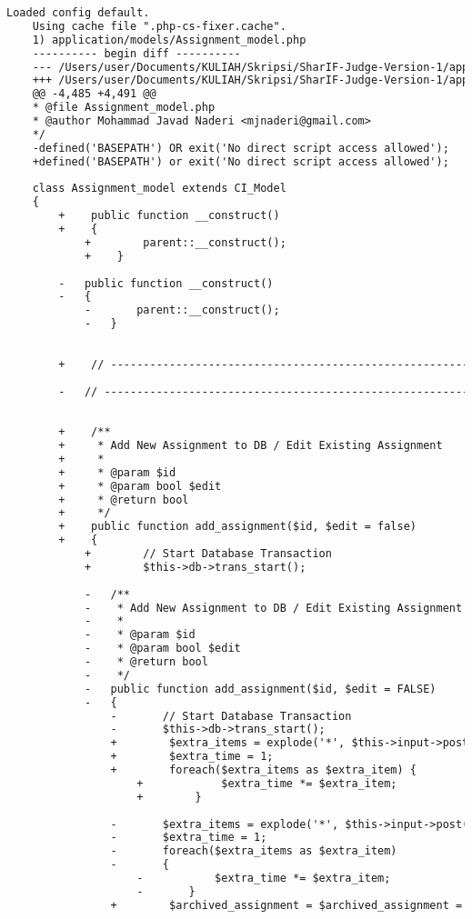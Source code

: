 \begin{lstlisting}[language=diff, caption=Perubahan pada kode Assignment\_model.php]
	Loaded config default.
	Using cache file ".php-cs-fixer.cache".
	1) application/models/Assignment_model.php
	---------- begin diff ----------
	--- /Users/user/Documents/KULIAH/Skripsi/SharIF-Judge-Version-1/application/models/Assignment_model.php
	+++ /Users/user/Documents/KULIAH/Skripsi/SharIF-Judge-Version-1/application/models/Assignment_model.php
	@@ -4,485 +4,491 @@
	* @file Assignment_model.php
	* @author Mohammad Javad Naderi <mjnaderi@gmail.com>
	*/
	-defined('BASEPATH') OR exit('No direct script access allowed');
	+defined('BASEPATH') or exit('No direct script access allowed');
	
	class Assignment_model extends CI_Model
	{
		+    public function __construct()
		+    {
			+        parent::__construct();
			+    }
		
		-	public function __construct()
		-	{
			-		parent::__construct();
			-	}
		
		
		+    // ------------------------------------------------------------------------
		
		-	// ------------------------------------------------------------------------
		
		
		+    /**
		+     * Add New Assignment to DB / Edit Existing Assignment
		+     *
		+     * @param $id
		+     * @param bool $edit
		+     * @return bool
		+     */
		+    public function add_assignment($id, $edit = false)
		+    {
			+        // Start Database Transaction
			+        $this->db->trans_start();
			
			-	/**
			-	 * Add New Assignment to DB / Edit Existing Assignment
			-	 *
			-	 * @param $id
			-	 * @param bool $edit
			-	 * @return bool
			-	 */
			-	public function add_assignment($id, $edit = FALSE)
			-	{
				-		// Start Database Transaction
				-		$this->db->trans_start();
				+        $extra_items = explode('*', $this->input->post('extra_time'));
				+        $extra_time = 1;
				+        foreach($extra_items as $extra_item) {
					+            $extra_time *= $extra_item;
					+        }
				
				-		$extra_items = explode('*', $this->input->post('extra_time'));
				-		$extra_time = 1;
				-		foreach($extra_items as $extra_item)
				-		{
					-			$extra_time *= $extra_item;
					-		}
				+        $archived_assignment = $archived_assignment = $this->input->post('archived_assignment') !== null ? 1 : 0;
				

\end{lstlisting}
